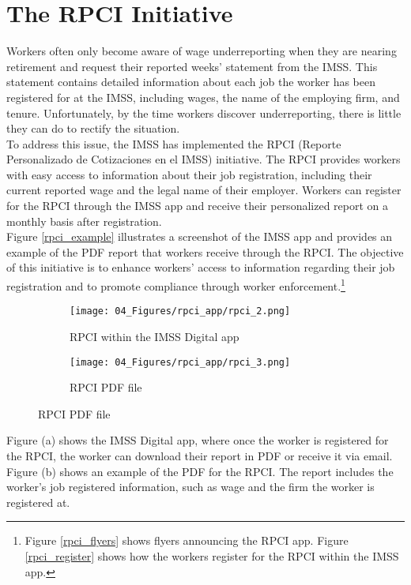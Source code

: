 \documentclass[10pt, oneside]{book}
\begin{document}
\section{The RPCI Initiative}

Workers often only become aware of wage underreporting when they are nearing retirement and request their reported weeks' statement from the IMSS. This statement contains detailed information about each job the worker has been registered for at the IMSS, including wages, the name of the employing firm, and tenure. Unfortunately, by the time workers discover underreporting, there is little they can do to rectify the situation. \\ 

To address this issue, the IMSS has implemented the RPCI (Reporte Personalizado de Cotizaciones en el IMSS) initiative. The RPCI provides workers with easy access to information about their job registration, including their current reported wage and the legal name of their employer. Workers can register for the RPCI through the IMSS app and receive their personalized report on a monthly basis after registration. \\

Figure \ref{rpci_example} illustrates a screenshot of the IMSS app and provides an example of the PDF report that workers receive through the RPCI. The objective of this initiative is to enhance workers' access to information regarding their job registration and to promote compliance through worker enforcement.\footnote{Figure \ref{rpci_flyers} shows flyers announcing the RPCI app. Figure \ref{rpci_register} shows how the workers register for the RPCI within the IMSS app.} \\ 

\begin{figure}[H]
    \caption{RPCI example}
    \label{rpci_example}
    \begin{center}
    
    \begin{subfigure}{0.49\textwidth}
    \caption{RPCI within the IMSS Digital app}
    \texttt{[image: 04\_Figures/rpci\_app/rpci\_2.png]}
    \end{subfigure}
    \begin{subfigure}{0.49\textwidth}
    \caption{RPCI PDF file}
    \texttt{[image: 04\_Figures/rpci\_app/rpci\_3.png]}
    \end{subfigure}
    

    \end{center}
\end{figure}
\scriptsize{
\noindent Figure (a) shows the IMSS Digital app, where once the worker is registered for the RPCI, the worker can download their report in PDF or receive it via email. Figure (b) shows an example of the PDF for the RPCI. The report includes the worker's job registered information, such as wage and the firm the worker is registered at.
} \\
\end{document}
